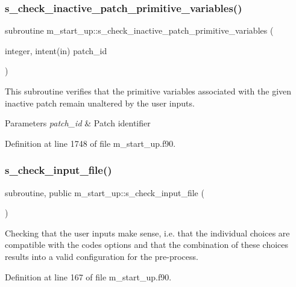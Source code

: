 \subsubsection{\texorpdfstring{s\+\_\+check\+\_\+inactive\+\_\+patch\+\_\+primitive\+\_\+variables()}{s\_check\_inactive\_patch\_primitive\_variables()}}
{\footnotesize\ttfamily subroutine m\+\_\+start\+\_\+up\+::s\+\_\+check\+\_\+inactive\+\_\+patch\+\_\+primitive\+\_\+variables (\begin{DoxyParamCaption}\item[{integer, intent(in)}]{patch\+\_\+id }\end{DoxyParamCaption})}



This subroutine verifies that the primitive variables associated with the given inactive patch remain unaltered by the user inputs. 


\begin{DoxyParams}{Parameters}
{\em patch\+\_\+id} & Patch identifier \\
\hline
\end{DoxyParams}


Definition at line 1748 of file m\+\_\+start\+\_\+up.\+f90.

\mbox{\label{namespacem__start__up_ab5f7e03f1da1999ee699cec4f26370e0}} 
\subsubsection{\texorpdfstring{s\+\_\+check\+\_\+input\+\_\+file()}{s\_check\_input\_file()}}
{\footnotesize\ttfamily subroutine, public m\+\_\+start\+\_\+up\+::s\+\_\+check\+\_\+input\+\_\+file (\begin{DoxyParamCaption}{ }\end{DoxyParamCaption})}



Checking that the user inputs make sense, i.\+e. that the individual choices are compatible with the code\textquotesingle{}s options and that the combination of these choices results into a valid configuration for the pre-\/process. 



Definition at line 167 of file m\+\_\+start\+\_\+up.\+f90.

